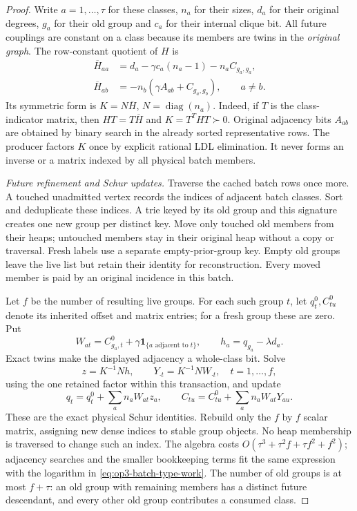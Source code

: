 \begin{proof}
Write $a=1,\ldots,\tau$ for these classes, $n_a$ for their sizes,
$d_a$ for their original degrees, $g_a$ for their old group and $c_a$
for their internal clique bit. All future couplings are constant on a
class because its members are twins in the \emph{original graph}.
The row-constant quotient of $H$ is
\begin{align*}
 \overline H_{aa}&=d_a-\gamma c_a(n_a-1)-n_a C_{g_a,g_a},\\
 \overline H_{ab}&=-n_b(\gamma A_{ab}+C_{g_a,g_b}),\qquad a\ne b.
\end{align*}
Its symmetric form is $K=N\overline H$, $N=\operatorname{diag}(n_a)$.
Indeed, if $T$ is the class-indicator matrix, then $HT=T\overline H$
and $K=T^THT\succ0$. Original adjacency bits $A_{ab}$ are obtained
by binary search in the already sorted representative rows. The producer
factors $K$ once by explicit rational LDL elimination. It never forms
an inverse or a matrix indexed by all physical batch members.

\emph{Future refinement and Schur updates.}
Traverse the cached batch rows once more. A touched unadmitted vertex
records the indices of adjacent batch classes. Sort and deduplicate
these indices. A trie keyed by its old group and this signature creates
one new group per distinct key. Move only touched old members from their
heaps; untouched members stay in their original heap without a copy or
traversal. Fresh labels use a separate empty-prior-group key. Empty old
groups leave the live list but retain their identity for reconstruction.
Every moved member is paid by an original incidence in this batch.

Let $f$ be the number of resulting live groups. For each such group $t$,
let $q_t^0,C_{tu}^0$ denote its inherited offset and matrix entries;
for a fresh group these are zero. Put
\[
 W_{at}=C^0_{g_a,t}+\gamma\mathbf1_{\{a\text{ adjacent to }t\}},
 \qquad h_a=q_{g_a}-\lambda d_a.
\]
Exact twins make the displayed adjacency a whole-class bit. Solve
\[
 z=K^{-1}Nh,\qquad Y_{\cdot t}=K^{-1}N W_{\cdot t},
 \quad t=1,\ldots,f,
\]
using the one retained factor within this transaction, and update
\begin{equation}
 q_t=q_t^0+\sum_a n_a W_{at}z_a,
 \qquad C_{tu}=C_{tu}^0+\sum_a n_a W_{at}Y_{au}.
 \label{eq:op3-batch-quotient-update}
\end{equation}
These are the exact physical Schur identities. Rebuild only the $f$ by
$f$ scalar matrix, assigning new dense indices to stable group objects.
No heap membership is traversed to change such an index. The algebra
costs $O(\tau^3+\tau^2 f+\tau f^2+f^2)$; adjacency searches and the
smaller bookkeeping terms fit the same expression with the logarithm
in \cref{eq:op3-batch-type-work}. The number of old groups is at most
$f+\tau$: an old group with remaining members has a distinct future
descendant, and every other old group contributes a consumed class.


\end{proof}
